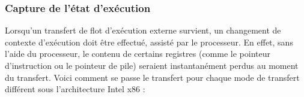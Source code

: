 			\subsubsection{Capture de l'état d'exécution}



Lorsqu'un transfert de flot d'exécution externe survient, un changement de contexte d'exécution doit être effectué, assisté par le processeur. En effet, sans l'aide du processeur, le contenu de certains registres (comme le pointeur d'instruction ou le pointeur de pile) seraient instantanément perdus au moment du transfert. Voici comment se passe le transfert pour chaque mode de transfert différent sous l'architecture Intel x86 : 


